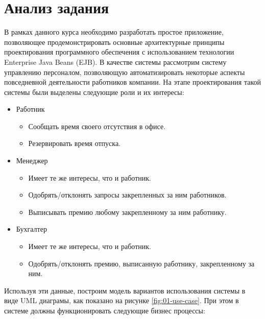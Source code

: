 \section{Анализ задания}

В рамках данного курса необходимо разработать простое приложение, позволяющее продемонстрировать основные архитектурные принципы 
проектирования программного обеспечения с использованием технологии Enterprise Java Beans (EJB). В качестве системы рассмотрим систему 
управлению персоналом, позволяющую автоматизировать некоторые аспекты повседневной деятельности работников компании. На этапе проектирования 
такой системы были выделены следующие роли и их интересы:

\begin{itemize}
    \item Работник 
    \begin{itemize}
        \item Сообщать время своего отсутствия в офисе.
        \item Резервировать время отпуска. 
    \end{itemize}
    \item Менеджер
    \begin{itemize}
        \item Имеет те же интересы, что и работник.
        \item Одобрять/отклонять запросы закрепленных за ним работников.
        \item Выписывать премию любому закрепленному за ним работнику. 
    \end{itemize}
    \item Бухгалтер
    \begin{itemize}
        \item Имеет те же интересы, что и работник.
        \item Одобрять/отклонять премию, выписанную работнику, закрепленному за ним.
    \end{itemize}
\end{itemize}

Используя эти данные, построим модель вариантов использования системы в виде UML диаграмы, как показано на рисунке \ref{fig:01-use-case}. 
При этом в системе должны функционировать следующие бизнес процессы:

